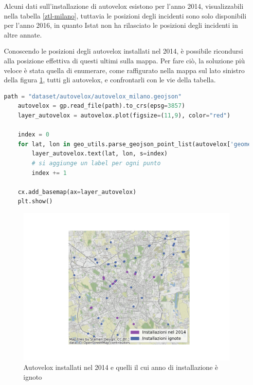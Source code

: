 \documentclass[a4paper]{report}
\begin{document}
Alcuni dati sull'installazione di autovelox esistono per l'anno 2014, visualizzabili nella 
tabella \ref{ztl-milano}, tuttavia le posizioni degli incidenti 
sono solo disponibili per l'anno 2016, in quanto Istat non ha rilasciato 
le posizioni degli incidenti in altre annate.

Conoscendo le posizioni degli autovelox installati nel 2014, è possibile ricondursi alla 
posizione effettiva di questi ultimi sulla mappa.
Per fare ciò, la soluzione più veloce è stata quella di enumerare, 
come raffigurato nella mappa sul lato sinistro della figura \ref{fig:autovelox-indici}, 
tutti gli autovelox, e confrontarli con le vie della tabella.

\begin{lstlisting}[language=Python]
    path = "dataset/autovelox/autovelox_milano.geojson"
    autovelox = gp.read_file(path).to_crs(epsg=3857)
    layer_autovelox = autovelox.plot(figsize=(11,9), color="red")
    
    index = 0
    for lat, lon in geo_utils.parse_geojson_point_list(autovelox['geometry'].astype(str)):
        layer_autovelox.text(lat, lon, s=index)
        # si aggiunge un label per ogni punto
        index += 1
    
    cx.add_basemap(ax=layer_autovelox)
    plt.show()
\end{lstlisting}

\begin{figure}
    \includegraphics[width=\linewidth]{../src/autovelox/autovelox_2014.png}
    \caption{Autovelox installati nel 2014 e quelli il cui anno di installazione è ignoto}
    \label{fig:autovelox-indici}
\end{figure}
\end{document}
